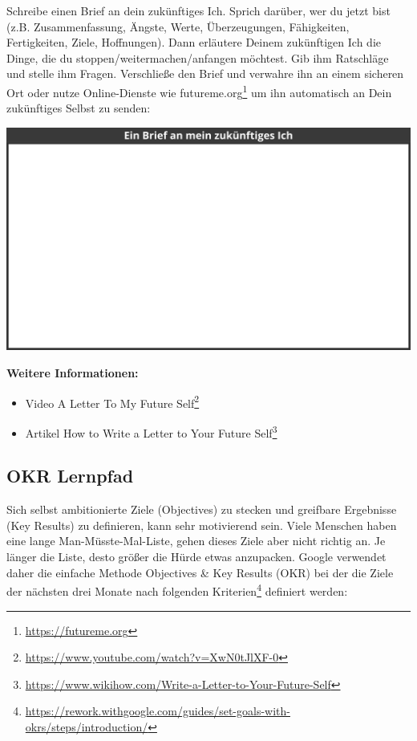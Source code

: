 \documentclass[
  ngerman,
  paper=a4,
,captions=tableheading
]{scrartcl}
\DeclareRobustCommand{\href}[2]{#2\footnote{\url{#1}}}
\providecommand{\tightlist}{%
  \setlength{\itemsep}{0pt}\setlength{\parskip}{0pt}}
\begin{document}
Schreibe einen Brief an dein zukünftiges Ich. Sprich darüber, wer du
jetzt bist (z.B. Zusammenfassung, Ängste, Werte, Überzeugungen,
Fähigkeiten, Fertigkeiten, Ziele, Hoffnungen). Dann erläutere Deinem
zukünftigen Ich die Dinge, die du stoppen/weitermachen/anfangen
möchtest. Gib ihm Ratschläge und stelle ihm Fragen. Verschließe den
Brief und verwahre ihn an einem sicheren Ort oder nutze Online-Dienste
wie \href{https://futureme.org}{futureme.org} um ihn automatisch an Dein
zukünftiges Selbst zu senden:

\includegraphics{./tex2pdf.-af94b87e0fdb9aa6/15a0f9300a5b0066a418f759ebc52be34fb130a8.png}

\textbf{Weitere Informationen:}

\begin{itemize}
\tightlist
\item
  Video \href{https://www.youtube.com/watch?v=XwN0tJlXF-0}{A Letter To
  My Future Self}
\item
  Artikel
  \href{https://www.wikihow.com/Write-a-Letter-to-Your-Future-Self}{How
  to Write a Letter to Your Future Self}
\end{itemize}

\hypertarget{okr-lernpfad}{%
\subsection{OKR Lernpfad}\label{okr-lernpfad}}

Sich selbst ambitionierte Ziele (Objectives) zu stecken und greifbare
Ergebnisse (Key Results) zu definieren, kann sehr motivierend sein.
Viele Menschen haben eine lange Man-Müsste-Mal-Liste, gehen dieses Ziele
aber nicht richtig an. Je länger die Liste, desto größer die Hürde etwas
anzupacken. Google verwendet daher die einfache Methode Objectives \&
Key Results (OKR) bei der die Ziele der nächsten drei Monate
\href{https://rework.withgoogle.com/guides/set-goals-with-okrs/steps/introduction/}{nach
folgenden Kriterien} definiert werden:
\end{document}
